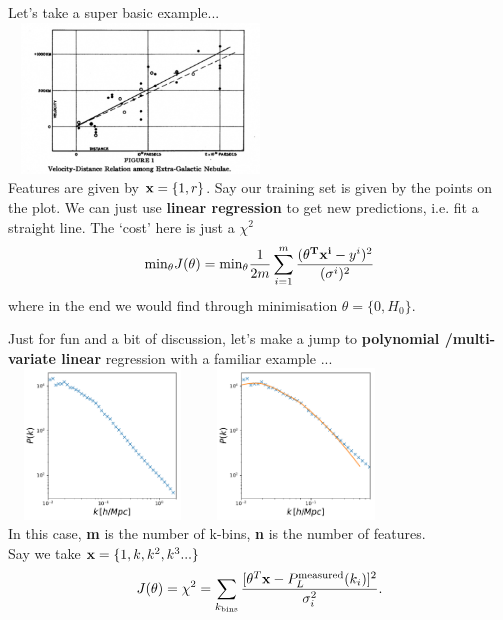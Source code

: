 \documentclass[usenames,dvipsnames]{beamer}
\begin{document}
\begin{frame}
Let's take a super basic example... \\ 
\centering
    \includegraphics[width=7cm,height=4cm]{figs/class_linear.jpg} \\
Features are given by $ {\bf x} = \{1, r \}$. Say our training set is given by the points on the plot. We can just use {\bf linear regression} to get new predictions, i.e. fit a straight line. The `cost' here is just a $\chi^2$ \pause
\begin{equation}
{\rm min}_\theta  J({\bf \theta}) = {\rm min}_\theta  \frac{1}{2m} \sum_{i=1}^m \frac{({\bf \theta^Tx^i } - y^i )^2}{(\sigma^i)^2}
\end{equation}
\pause 
where in the end we would find through minimisation $\theta = \{ 0 , H_0 \}.$
\end{frame}


\begin{frame}
Just for fun and a bit of discussion, let's make a jump to {\bf polynomial /multi-variate linear} regression with a familiar example ... \\ \pause 
\centering 
    \includegraphics[width=5cm,height=4cm]{figs/pofk.pdf}
    \includegraphics[width=5cm,height=4cm]{figs/pofk2.pdf} \\ \pause
In this case, {\bf \color{red} m} is the number of k-bins,  {\bf \color{red} n} is the number of features. \\
Say we take ${\bf x} = \{1, k, k^2 , k^3 ...\}$
\begin{equation}
J(\theta) = \chi^2 =  \sum_{k_{\rm bins}} \frac{ [\theta^T{\bf x}- P_L^{\rm measured}(k_i)]^2}{\sigma_i^2}. 
\end{equation}
\end{frame}
\end{document}
